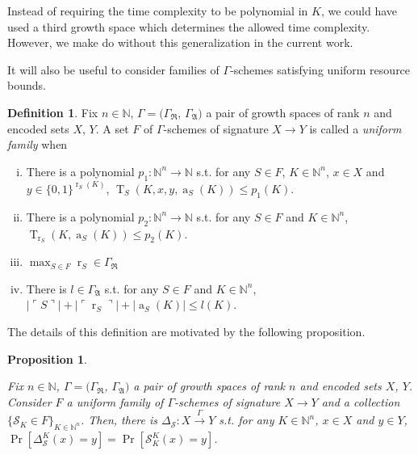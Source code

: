 \documentclass{article}
\theoremstyle{definition}
\newtheorem{definition}{Definition}[section]
\theoremstyle{plain}
\newtheorem{proposition}{Proposition}[section]
\newcommand{\WordsLen}[1]{{\{ 0, 1 \}^{#1}}}
\DeclareMathOperator{\T}{T}
\DeclareMathOperator{\R}{r}
\DeclareMathOperator{\A}{a}
\newcommand{\Nats}{\mathbb{N}}
\newcommand{\Abs}[1]{\lvert #1 \rvert}
\newcommand{\Quote}[1]{\ulcorner #1 \urcorner}
\begin{document}
Instead of requiring the time complexity to be polynomial in $K$, we could have used a third growth space which determines the allowed time complexity. However, we make do without this generalization in the current work.

It will also be useful to consider families of $\Gamma$-schemes satisfying uniform resource bounds.

\begin{definition}

Fix $n \in \Nats$, $\Gamma=(\Gamma_{\mathfrak{R}}$, $\Gamma_{\mathfrak{A}})$ a pair of growth spaces of rank $n$ and encoded sets $X$, $Y$. A set $F$ of $\Gamma$-schemes of signature $X \rightarrow Y$ is called a \emph{uniform family} when

\begin{enumerate}[(i)]

\item There is a polynomial $p_1: \Nats^n \rightarrow \Nats$ s.t. for any $S \in F$, $K \in \Nats^n$, $x \in X$ and $y \in \WordsLen{\R_S(K)}$, $\T_S(K,x,y,\A_S(K)) \leq p_1(K)$.

\item There is a polynomial $p_2: \Nats^n \rightarrow \Nats$ s.t. for any $S \in F$ and $K \in \Nats^n$, $\T_{\R_S}(K,\A_S(K)) \leq p_2(K)$.

\item $\max_{S \in F} \R_S \in \Gamma_{\mathfrak{R}}$

\item There is $l \in \Gamma_{\mathfrak{A}}$ s.t. for any $S \in F$ and $K \in \Nats^n$, ${\Abs{\Quote{S}} + \Abs{\Quote{\R_S}} + \Abs{\A_S(K)} \leq l(K)}$.

\end{enumerate}

\end{definition}

The details of this definition are motivated by the following proposition.

\begin{proposition}
\label{prp:fam_diag}

Fix $n \in \Nats$, $\Gamma=(\Gamma_{\mathfrak{R}}$, $\Gamma_{\mathfrak{A}})$ a pair of growth spaces of rank $n$ and encoded sets $X$, $Y$. Consider $F$ a uniform family of $\Gamma$-schemes of signature $X \rightarrow Y$ and a collection $\{\mathcal{S}_K \in F\}_{K \in \Nats^n}$. Then, there is $\Delta_\mathcal{S}: X \xrightarrow{
\Gamma} Y$ s.t. for any $K \in \Nats^n$, $x \in X$ and $y \in Y$, $\Pr[\Delta_\mathcal{S}^K(x)=y] = \Pr[\mathcal{S}_K^K(x)=y]$.

\end{proposition}
\end{document}
